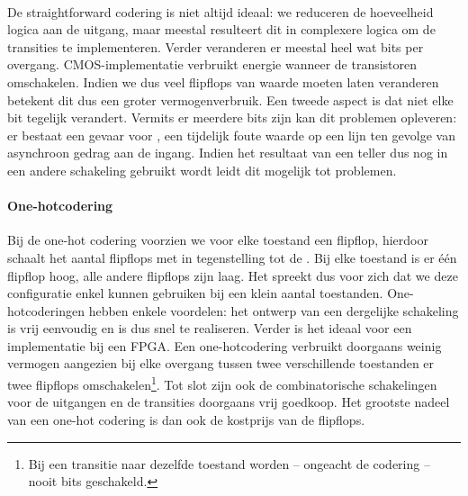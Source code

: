 \paragraph{}
De straightforward codering is niet altijd ideaal: we reduceren de hoeveelheid logica aan de uitgang, maar meestal resulteert dit in complexere logica om de transities te implementeren. Verder veranderen er meestal heel wat bits per overgang. CMOS-implementatie verbruikt energie wanneer de transistoren omschakelen. Indien we dus veel flipflops van waarde moeten laten veranderen betekent dit dus een groter vermogenverbruik. Een tweede aspect is dat niet elke bit tegelijk verandert. Vermits er meerdere bits zijn kan dit problemen opleveren: er bestaat een gevaar voor , een tijdelijk foute waarde op een lijn ten gevolge van asynchroon gedrag aan de ingang. Indien het resultaat van een teller dus nog in een andere schakeling gebruikt wordt leidt dit mogelijk tot problemen.

\paragraph{One-hotcodering}
Bij de one-hot codering voorzien we voor elke toestand een flipflop, hierdoor schaalt het aantal flipflops met  in tegenstelling tot de . Bij elke toestand is er \'e\'en flipflop hoog, alle andere flipflops zijn laag. Het spreekt dus voor zich dat we deze configuratie enkel kunnen gebruiken bij een klein aantal toestanden. One-hotcoderingen hebben enkele voordelen: het ontwerp van een dergelijke schakeling is vrij eenvoudig en is dus snel te realiseren. Verder is het ideaal voor een implementatie bij een FPGA. Een one-hotcodering verbruikt doorgaans weinig vermogen aangezien bij elke overgang tussen twee verschillende toestanden er twee flipflops omschakelen\footnote{Bij een transitie naar dezelfde toestand worden -- ongeacht de codering -- nooit bits geschakeld.}. Tot slot zijn ook de combinatorische schakelingen voor de uitgangen en de transities doorgaans vrij goedkoop. Het grootste nadeel van een one-hot codering is dan ook de kostprijs van de flipflops.


